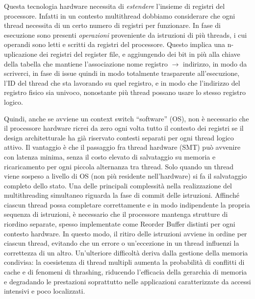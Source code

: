 \noindent Questa tecnologia hardware necessita di \textit{estendere} l'insieme di registri del processore. Infatti in un contesto multithread dobbiamo considerare che ogni thread necessita di un certo numero di registri per funzionare. In fase di esecuzione sono presenti \textit{operazioni} proveniente da istruzioni di più threads, i cui operandi sono letti e scritti da registri del processore. Questo implica una n-uplicazione dei registri del register file, e aggiungendo dei bit in più alla chiave della tabella che mantiene l'associazione nome registro $\rightarrow$ indirizzo, in modo da scriverci, in fase di issue quindi in modo totalmente trasparente all'esecuzione, l'ID del thread che sta lavorando su quel registro, e in modo che l'indirizzo del registro fisico sia univoco, nonostante più thread possano usare lo stesso registro logico. 

\noindent Quindi, anche se avviene un context switch “software” (OS), non è necessario che il processore hardware ricrei da zero ogni volta tutto il contesto dei registri se il design architetturale ha già riservato contesti separati per ogni thread logico attivo. Il vantaggio è che il passaggio fra thread hardware (SMT) può avvenire con latenza minima, senza il costo elevato di salvataggio su memoria e ricaricamento per ogni piccola alternanza tra thread. Solo quando un thread viene sospeso a livello di OS (non più residente nell’hardware) si fa il salvataggio completo dello stato.
Una delle principali complessità nella realizzazione del multithreading simultaneo riguarda la fase di commit delle istruzioni. Affinché ciascun thread possa completare correttamente e in modo indipendente la propria sequenza di istruzioni, è necessario che il processore mantenga strutture di riordino separate, spesso implementate come Reorder Buffer distinti per ogni contesto hardware. In questo modo, il ritiro delle istruzioni avviene in ordine per ciascun thread, evitando che un errore o un'eccezione in un thread influenzi la correttezza di un altro. Un'ulteriore difficoltà deriva dalla gestione della memoria condivisa: la coesistenza di thread multipli aumenta la probabilità di conflitti di cache e di fenomeni di thrashing, riducendo l'efficacia della gerarchia di memoria e degradando le prestazioni soprattutto nelle applicazioni caratterizzate da accessi intensivi e poco localizzati.

